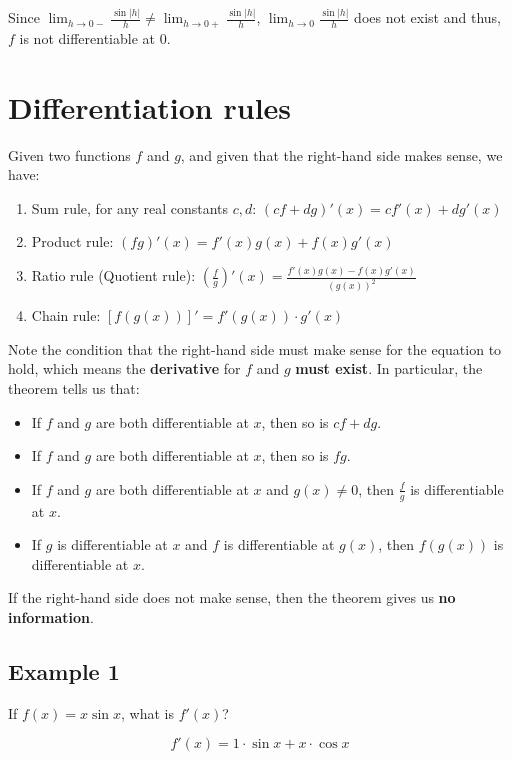 \documentclass[11pt]{article}
\begin{document}
Since \(\lim_{h \rightarrow 0-} \frac{\sin |h|}{h} \neq \lim_{h \rightarrow 0+} \frac{\sin |h|}{h}\), \(\lim_{h \rightarrow 0} \frac{\sin |h|}{h}\) does not exist and thus, \(f\) is not differentiable at 0.

\newpage
\section{Differentiation rules}
\label{sec:org0b579bd}
Given two functions \(f\) and \(g\), and given that the right-hand side makes sense, we have:

\begin{enumerate}
\item Sum rule, for any real constants \(c, d\): \((cf + dg)'(x) = cf'(x) + dg'(x)\)
\item Product rule: \((fg)'(x) = f'(x)g(x) + f(x)g'(x)\)
\item Ratio rule (Quotient rule): \(\left( \frac{f}{g} \right)'(x) = \frac{f'(x)g(x) - f(x) g'(x)}{(g(x))^2}\)
\item Chain rule: \([f(g(x))]' = f'(g(x)) \cdot g'(x)\)
\end{enumerate}

Note the condition that the right-hand side must make sense for the equation to hold, which means the \textbf{derivative} for \(f\) and \(g\) \textbf{must exist}. In particular, the theorem tells us that:
\begin{itemize}
\item If \(f\) and \(g\) are both differentiable at \(x\), then so is \(cf + dg\).
\item If \(f\) and \(g\) are both differentiable at \(x\), then so is \(fg\).
\item If \(f\) and \(g\) are both differentiable at \(x\) and \(g(x) \neq 0\), then \(\frac{f}{g}\) is differentiable at \(x\).
\item If \(g\) is differentiable at \(x\) and \(f\) is differentiable at \(g(x)\), then \(f(g(x))\) is differentiable at \(x\).
\end{itemize}

If the right-hand side does not make sense, then the theorem gives us \textbf{no information}.

\newpage
\subsection{Example 1}
\label{sec:org52924c2}
If \(f(x) = x \sin x\), what is \(f'(x)\)?

\[f'(x) = 1 \cdot \sin x + x \cdot \cos x\]
\end{document}
